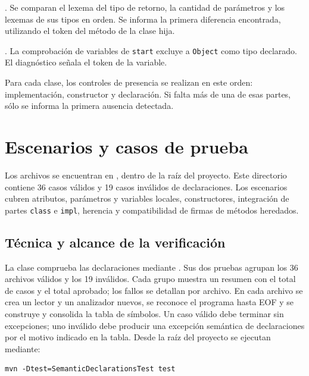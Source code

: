 \begin{description}[style=nextline]
  \item[Redefinición incompatible de un método heredado]
  . Se comparan el lexema del tipo
  de retorno, la cantidad de parámetros y los lexemas de sus tipos en
  orden. Se informa la primera diferencia encontrada, utilizando el
  token del método de la clase hija.

  \item[Variable de tipo \texttt{Object} en el bloque de entrada]
  . La comprobación de variables
  de \texttt{start} excluye a \texttt{Object} como tipo declarado.
  El diagnóstico señala el token de la variable.
\end{description}

Para cada clase, los controles de presencia se realizan en este orden:
implementación, constructor y declaración. Si falta más de una de esas
partes, sólo se informa la primera ausencia detectada.

\clearpage
\section{Escenarios y casos de prueba}
\label{sec:casos-declaraciones}
\begingroup
\setlength{\emergencystretch}{3em}
Los archivos se encuentran en , dentro de la raíz
del proyecto. Este directorio contiene 36 casos válidos y 19 casos
inválidos de declaraciones.
Los escenarios cubren atributos, parámetros y variables locales,
constructores, integración de partes \texttt{class} e \texttt{impl},
herencia y compatibilidad de firmas de métodos heredados.

\subsection{Técnica y alcance de la verificación}
La clase  comprueba las declaraciones
mediante . Sus dos pruebas agrupan los
36 archivos válidos y los 19 inválidos. Cada grupo muestra un resumen
con el total de casos y el total aprobado; los fallos se detallan por
archivo. En cada archivo se
crea un lector y un analizador nuevos, se reconoce el programa hasta EOF
y se construye y consolida la tabla de símbolos. Un caso válido debe
terminar sin excepciones; uno inválido debe producir una excepción
semántica de declaraciones por el motivo indicado en la tabla.
Desde la raíz del proyecto se ejecutan mediante:
\begin{verbatim}
mvn -Dtest=SemanticDeclarationsTest test
\end{verbatim}

